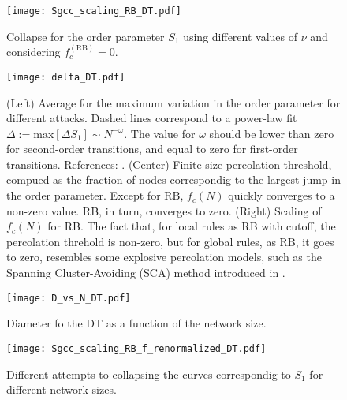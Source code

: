 \documentclass{article}
\begin{document}
\begin{figure}
\centering
\texttt{[image: Sgcc\_scaling\_RB\_DT.pdf]}
\caption{Collapse for the order parameter $S_1$ using different values of $\nu$ and considering $f_c^{\mathrm{(RB)}} = 0$.}
\end{figure}

\begin{figure}
\centering
\texttt{[image: delta\_DT.pdf]}
\caption{(Left) Average for the maximum variation in the order parameter for different attacks. Dashed lines correspond to a power-law fit $\Delta := \mathrm{max}[\Delta S_1] \sim N^{-\omega}$. The value for $\omega$ should be lower than zero for second-order transitions, and equal to zero for first-order transitions. References: \cite{Trevelyan2018DegreeInformation,Bastas2014a,Nagler2011a,Fan2020}. (Center) Finite-size percolation threshold, compued as the fraction of nodes correspondig to the largest jump in the order parameter. Except for RB, $f_c(N)$ quickly converges to a non-zero value. RB, in turn, converges to zero. (Right) Scaling of $f_c(N)$ for RB. The fact that, for local rules as RB with cutoff, the percolation threhold is non-zero, but for global rules, as RB, it goes to zero, resembles some explosive percolation models, such as the Spanning Cluster-Avoiding (SCA) method introduced in \cite{Cho2013}. }
\end{figure}

\begin{figure}
\centering
\texttt{[image: D\_vs\_N\_DT.pdf]}
\caption{Diameter fo the DT as a function of the network size.}
\end{figure}

\begin{figure}
\centering
\texttt{[image: Sgcc\_scaling\_RB\_f\_renormalized\_DT.pdf]}
\caption{Different attempts to collapsing the curves correspondig to $S_1$ for different network sizes.}
\end{figure}




\end{document}
